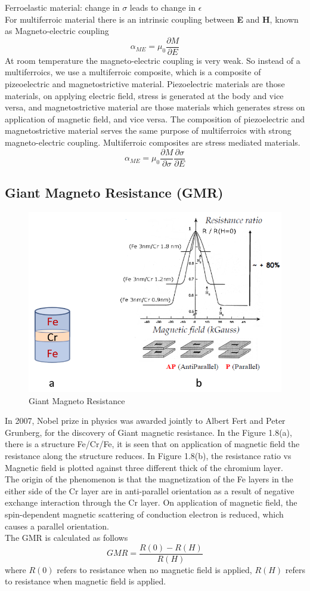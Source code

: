 Ferroelastic material: change in $\sigma$ leads to change in $\epsilon$\\
For multiferroic material there is an intrinsic coupling between \textbf{E} and \textbf{H}, known as Magneto-electric coupling
\[\alpha_{ME}=\mu_0\frac{\partial M}{\partial E}\]
At room temperature the magneto-electric coupling is very weak. So instead of a multiferroics, we use a multiferroic composite, which is a composite of pizeoelectric and magnetostrictive material. Piezoelectric materials are those materials, on applying electric field, stress is generated at the body and vice versa, and magnetostrictive material are those materials which generates stress on application of magnetic field, and vice versa. The composition of piezoelectric and magnetostrictive material serves the same purpose of multiferroics with strong magneto-electric coupling. Multiferroic composites are stress mediated materials.
\[\alpha_{ME}=\mu_0\frac{\partial M}{\partial \sigma}\frac{\partial \sigma}{\partial E}\] 

\subsection{Giant Magneto Resistance (GMR)}
\begin{figure}[H]
	\centering
   \includegraphics[scale=0.56]{Images/25.png} 
   \caption{Giant Magneto Resistance}
\end{figure}
In 2007, Nobel prize in physics was awarded jointly to Albert Fert and Peter Grunberg, for the discovery of Giant magnetic resistance. In the Figure 1.8(a), there is a structure Fe/Cr/Fe, it is seen that on application of magnetic field the resistance along the structure reduces. In Figure 1.8(b), the resistance ratio vs Magnetic field is plotted against three different thick of  the chromium layer.\\
The origin of the phenomenon is that the magnetization of the Fe layers in the either side of the Cr layer are in anti-parallel orientation as a result of negative exchange interaction through the Cr layer. On application of magnetic field, the spin-dependent magnetic scattering of conduction electron is reduced, which causes a parallel orientation.\\
The GMR is calculated as follows
\[GMR=\frac{R(0)-R(H)}{R(H)}\]
where $R(0)$ refers to resistance when no magnetic field is applied, $R(H)$ refers to resistance when magnetic field is applied.
